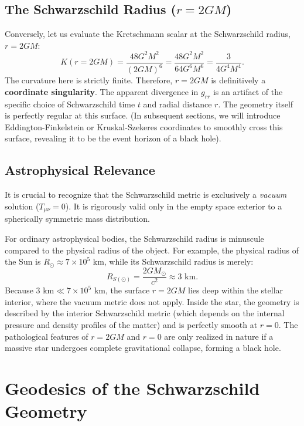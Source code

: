 \documentclass[11pt, a4paper]{report}
\begin{document}
\subsection{The Schwarzschild Radius ($r=2GM$)}
Conversely, let us evaluate the Kretschmann scalar at the Schwarzschild radius, $r = 2GM$:
\begin{equation}
K(r=2GM) = \frac{48G^{2}M^{2}}{(2GM)^{6}} = \frac{48G^{2}M^{2}}{64G^{6}M^{6}} = \frac{3}{4G^{4}M^{4}}.
\end{equation}
The curvature here is strictly finite. Therefore, $r=2GM$ is definitively a \textbf{coordinate singularity}. The apparent divergence in $g_{rr}$ is an artifact of the specific choice of Schwarzschild time $t$ and radial distance $r$. The geometry itself is perfectly regular at this surface. (In subsequent sections, we will introduce Eddington-Finkelstein or Kruskal-Szekeres coordinates to smoothly cross this surface, revealing it to be the event horizon of a black hole).

\subsection{Astrophysical Relevance}
It is crucial to recognize that the Schwarzschild metric is exclusively a \textit{vacuum} solution ($T_{\mu\nu} = 0$). It is rigorously valid only in the empty space exterior to a spherically symmetric mass distribution. 

For ordinary astrophysical bodies, the Schwarzschild radius is minuscule compared to the physical radius of the object. For example, the physical radius of the Sun is $R_{\odot} \approx 7 \times 10^{5} \text{ km}$, while its Schwarzschild radius is merely:
\begin{equation}
R_{S(\odot)} = \frac{2GM_{\odot}}{c^{2}} \approx 3 \text{ km}.
\end{equation}
Because $3 \text{ km} \ll 7 \times 10^{5} \text{ km}$, the surface $r=2GM$ lies deep within the stellar interior, where the vacuum metric does not apply. Inside the star, the geometry is described by the interior Schwarzschild metric (which depends on the internal pressure and density profiles of the matter) and is perfectly smooth at $r=0$. The pathological features of $r=2GM$ and $r=0$ are only realized in nature if a massive star undergoes complete gravitational collapse, forming a black hole.


\section{Geodesics of the Schwarzschild Geometry}
\end{document}
